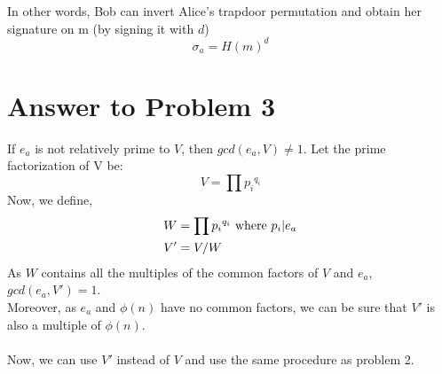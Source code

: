 \documentclass{article}
\begin{document}
In other words, Bob can invert Alice's trapdoor permutation and obtain her signature on m (by signing it with $d$)
\begin{equation*}
    \sigma_a = H(m) ^ d
\end{equation*}

\section*{Answer to Problem 3}

If $e_a$ is not relatively prime to $V$, then $gcd(e_a, V) \neq 1$.
Let the prime factorization of V be:
\begin{equation*}
    V = \prod {p_i} ^ {q_i}
\end{equation*}
Now, we define,
\begin{align*}
    &W = \prod {p_i} ^ {q_i} \text{\space where $p_i | e_a$} \\
    &V' = V / W
\end{align*}
As $W$ contains all the multiples of the common factors of $V$ and $e_a$, $gcd(e_a, V') = 1$.\\
Moreover, as $e_a$ and $\phi(n)$ have no common factors, we can be sure that $V'$ is also a multiple of $\phi(n)$.\\\\
Now, we can use $V'$ instead of $V$ and use the same procedure as problem 2.
\end{document}
